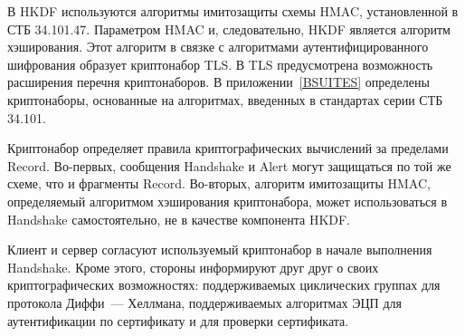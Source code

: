 В HKDF используются алгоритмы имитозащиты схемы HMAC, установленной в СТБ 
34.101.47. Параметром HMAC и, следовательно, HKDF является алгоритм хэширования. 
Этот алгоритм в связке с алгоритмами аутентифицированного шифрования образует 
криптонабор TLS.
%
В TLS предусмотрена возможность расширения перечня криптонаборов. В 
приложении~\ref{BSUITES} определены криптонаборы, основанные на 
алгоритмах, введенных в стандартах серии СТБ 34.101.

Криптонабор определяет правила криптографических вычислений за пределами Record. 
%
Во-первых, сообщения Handshake и Alert могут защищаться по той же схеме, что и 
фрагменты Record. 
%
Во-вторых, алгоритм имитозащиты HMAC, определяемый алгоритмом хэширования 
криптонабора, может использоваться в Handshake самостоятельно, не в качестве 
компонента HKDF.

Клиент и сервер согласуют используемый криптонабор в начале выполнения Handshake. 
%
Кроме этого, стороны информируют друг друг о своих криптографических 
возможностях: поддерживаемых циклических группах для протокола 
Диффи~--- Хеллмана, поддерживаемых алгоритмах ЭЦП для аутентификации по 
сертификату и для проверки сертификата.

